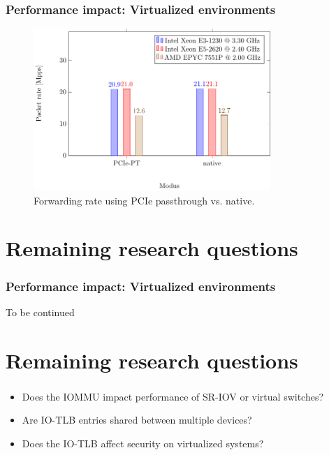 \begin{frame}
    \frametitle{Performance impact: Virtualized environments}

    \begin{figure}
        \centering
        \includegraphics[width=0.8\textwidth,clip]{figures/pcie-pt.pdf}
        \caption{Forwarding rate using PCIe passthrough vs. native.}
    \end{figure}
\end{frame}

\section{Remaining research questions}

\begin{frame}
    \frametitle{Performance impact: Virtualized environments}

    \begin{center}
        To be continued
    \end{center}
\end{frame}

\section{Remaining research questions}

\begin{frame}
    \frametitle{}

    \begin{itemize}
        \item Does the IOMMU impact performance of SR-IOV or virtual switches?
        \item Are IO-TLB entries shared between multiple devices?
        \item Does the IO-TLB affect security on virtualized systems?
    \end{itemize}
\end{frame}

